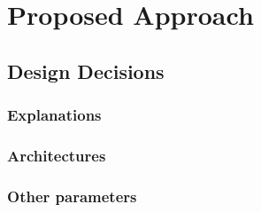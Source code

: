
\chapter{Proposed Approach}
\section{Design Decisions}
\subsection{Explanations}
\subsection{Architectures}
\subsection{Other parameters}
